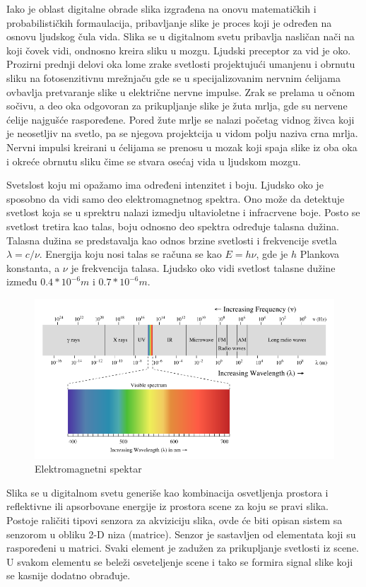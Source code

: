\documentclass[a4paper,12pt,titlepage]{article}
\begin{document}
Iako je oblast digitalne obrade slika izgrađena na onovu matematičkih i probabilističkih formaulacija, pribavljanje slike je proces koji je određen na osnovu ljudskog čula vida. Slika se u digitalnom svetu pribavlja nasličan nači na koji čovek vidi, ondnosno kreira sliku u mozgu. Ljudski preceptor za vid je oko. Prozirni prednji delovi oka lome zrake svetlosti projektujući umanjenu i obrnutu sliku na fotosenzitivnu mrežnjaču gde se u specijalizovanim nervnim ćelijama ovbavlja pretvaranje slike u električne nervne impulse. Zrak se prelama u očnom sočivu, a deo oka odgovoran za prikupljanje slike je žuta mrlja, gde su nervene ćelije najgušće raspoređene. Pored žute mrlje se nalazi početag vidnog živca koji je neosetljiv na svetlo, pa se njegova projektcija u vidom polju naziva crna mrlja. Nervni impulsi kreirani u ćelijama se prenosu u mozak koji spaja slike iz oba oka i okreće obrnutu sliku čime se stvara osećaj vida u ljudskom mozgu.

Svetslost koju mi opažamo ima određeni intenzitet i boju. Ljudsko oko je sposobno da vidi samo deo elektromagnetnog spektra. Ono može da detektuje svetlost koja se u sprektru nalazi izmedju ultavioletne i infracrvene boje. Posto se svetlost tretira kao talas, boju odnosno deo spektra određuje talasna dužina. Talasna dužina se predstavalja kao odnos brzine svetlosti i frekvencije svetla $\lambda = c / \nu$. Energija koju nosi talas se računa se kao $E = h \nu$, gde je $h$ Plankova konstanta, a $\nu$ je frekvencija talasa. Ljudsko oko vidi svetlost talasne dužine između $0.4 * 10^{-6}m$ i $0.7 * 10^{-6}m$.

\begin{figure}[ht!]
\centering
\includegraphics[width=120mm]{img/spektar.png}
\caption{Elektromagnetni spektar}
\label{overflow}
\end{figure} 

Slika se u digitalnom svetu generiše kao kombinacija osvetljenja prostora i reflektivne ili apsorbovane energije iz prostora scene za koju se pravi slika. Postoje raličiti tipovi senzora za akviziciju slika, ovde će biti opisan sistem sa senzorom u obliku 2-D niza (matrice). Senzor je sastavljen od elementata koji su raspoređeni u matrici. Svaki element je zadužen za prikupljanje svetlosti iz scene. U svakom elementu se beleži osveteljenje scene i tako se formira signal slike koji se kasnije dodatno obrađuje.
\end{document}
